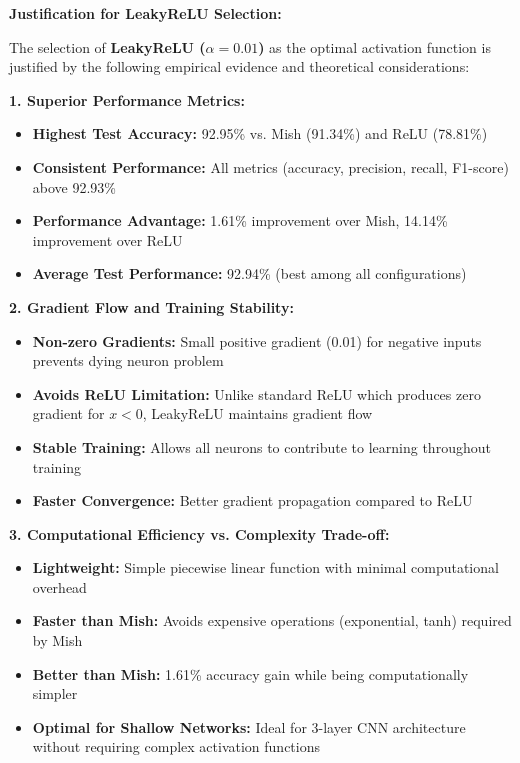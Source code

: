 \documentclass[12pt,a4paper]{article}
\begin{document}
\textbf{Justification for LeakyReLU Selection:}

The selection of \textbf{LeakyReLU ($\alpha=0.01$)} as the optimal activation function is justified by the following empirical evidence and theoretical considerations:

\textbf{1. Superior Performance Metrics:}
\begin{itemize}
    \item \textbf{Highest Test Accuracy:} 92.95\% vs. Mish (91.34\%) and ReLU (78.81\%)
    \item \textbf{Consistent Performance:} All metrics (accuracy, precision, recall, F1-score) above 92.93\%
    \item \textbf{Performance Advantage:} 1.61\% improvement over Mish, 14.14\% improvement over ReLU
    \item \textbf{Average Test Performance:} 92.94\% (best among all configurations)
\end{itemize}

\textbf{2. Gradient Flow and Training Stability:}
\begin{itemize}
    \item \textbf{Non-zero Gradients:} Small positive gradient (0.01) for negative inputs prevents dying neuron problem
    \item \textbf{Avoids ReLU Limitation:} Unlike standard ReLU which produces zero gradient for $x<0$, LeakyReLU maintains gradient flow
    \item \textbf{Stable Training:} Allows all neurons to contribute to learning throughout training
    \item \textbf{Faster Convergence:} Better gradient propagation compared to ReLU
\end{itemize}

\textbf{3. Computational Efficiency vs. Complexity Trade-off:}
\begin{itemize}
    \item \textbf{Lightweight:} Simple piecewise linear function with minimal computational overhead
    \item \textbf{Faster than Mish:} Avoids expensive operations (exponential, tanh) required by Mish
    \item \textbf{Better than Mish:} 1.61\% accuracy gain while being computationally simpler
    \item \textbf{Optimal for Shallow Networks:} Ideal for 3-layer CNN architecture without requiring complex activation functions
\end{itemize}
\end{document}
